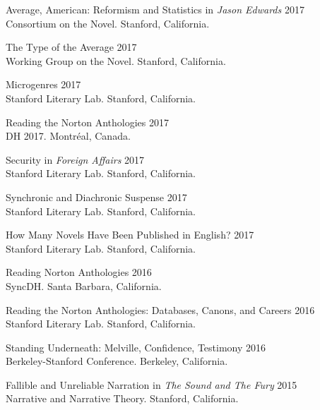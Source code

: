 \documentclass[
  12pt,
  letterpaper,
]{article}
\begin{document}
Average, American: Reformism and Statistics in \emph{Jason Edwards}
\hfill 2017\\
\hspace*{0.333em} Consortium on the Novel. Stanford, California.

The Type of the Average \hfill 2017\\
\hspace*{0.333em} Working Group on the Novel. Stanford, California.

Microgenres \hfill 2017\\
\hspace*{0.333em} Stanford Literary Lab. Stanford, California.

Reading the Norton Anthologies \hfill 2017\\
\hspace*{0.333em} DH 2017. Montréal, Canada.

Security in \emph{Foreign Affairs} \hfill 2017\\
\hspace*{0.333em} Stanford Literary Lab. Stanford, California.

Synchronic and Diachronic Suspense \hfill 2017\\
\hspace*{0.333em} Stanford Literary Lab. Stanford, California.

How Many Novels Have Been Published in English? \hfill 2017\\
\hspace*{0.333em} Stanford Literary Lab. Stanford, California.

Reading Norton Anthologies \hfill 2016\\
\hspace*{0.333em} SyncDH. Santa Barbara, California.

Reading the Norton Anthologies: Databases, Canons, and Careers
\hfill 2016\\
\hspace*{0.333em} Stanford Literary Lab. Stanford, California.

Standing Underneath: Melville, Confidence, Testimony \hfill 2016\\
\hspace*{0.333em} Berkeley-Stanford Conference. Berkeley, California.

Fallible and Unreliable Narration in \emph{The Sound and The Fury}
\hfill 2015\\
\hspace*{0.333em} Narrative and Narrative Theory. Stanford, California.
\end{document}
